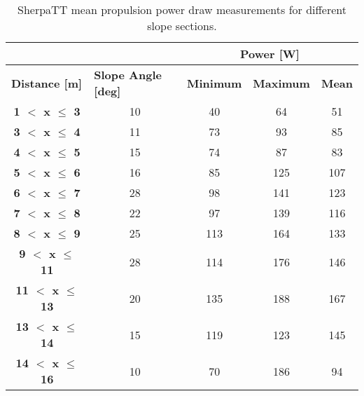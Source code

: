 \begin{table}[h]
\footnotesize
\centering
\caption[SherpaTT mean propulsion power draw measurements for different slope sections]
    {SherpaTT mean propulsion power draw measurements for different slope sections.}
\label{tab:sherpatt-upslope-terrain-local-media-measurement-summary}
\begin{tabular}{cc|c|c|c|}
\cline{3-5}
\multicolumn{1}{l}{} & \multicolumn{1}{l|}{} & \multicolumn{3}{c|}{\textbf{Power {[}W{]}}} \\ \hline
\multicolumn{1}{|l|}{\textbf{Distance {[}m{]}}} & \multicolumn{1}{l|}{\textbf{Slope Angle {[}deg{]}}} & \multicolumn{1}{l|}{\textbf{Minimum}} & \multicolumn{1}{l|}{\textbf{Maximum}} & \multicolumn{1}{l|}{\textbf{Mean}} \\ \hline
\multicolumn{1}{|c|}{\textbf{1 $<$ x $\leq$ 3}} & 10 & 40 & 64 & 51 \\ \hline
\multicolumn{1}{|c|}{\textbf{3 $<$ x $\leq$ 4}} & 11 & 73 & 93 & 85 \\ \hline
\multicolumn{1}{|c|}{\textbf{4 $<$ x $\leq$ 5}} & 15 & 74 & 87 & 83 \\ \hline
\multicolumn{1}{|c|}{\textbf{5 $<$ x $\leq$ 6}} & 16 & 85 & 125 & 107 \\ \hline
\multicolumn{1}{|c|}{\textbf{6 $<$ x $\leq$ 7}} & 28 & 98 & 141 & 123 \\ \hline
\multicolumn{1}{|c|}{\textbf{7 $<$ x $\leq$ 8}} & 22 & 97 & 139 & 116 \\ \hline
\multicolumn{1}{|c|}{\textbf{8 $<$ x $\leq$ 9}} & 25 & 113 & 164 & 133 \\ \hline
\multicolumn{1}{|c|}{\textbf{9 $<$ x $\leq$ 11}} & 28 & 114 & 176 & 146 \\ \hline
\multicolumn{1}{|c|}{\textbf{11 $<$ x $\leq$ 13}} & 20 & 135 & 188 & 167 \\ \hline
\multicolumn{1}{|c|}{\textbf{13 $<$ x $\leq$ 14}} & 15 & 119 & 123 & 145 \\ \hline
\multicolumn{1}{|c|}{\textbf{14 $<$ x $\leq$ 16}} & 10 & 70 & 186 & 94 \\ \hline
\end{tabular}
\end{table}
